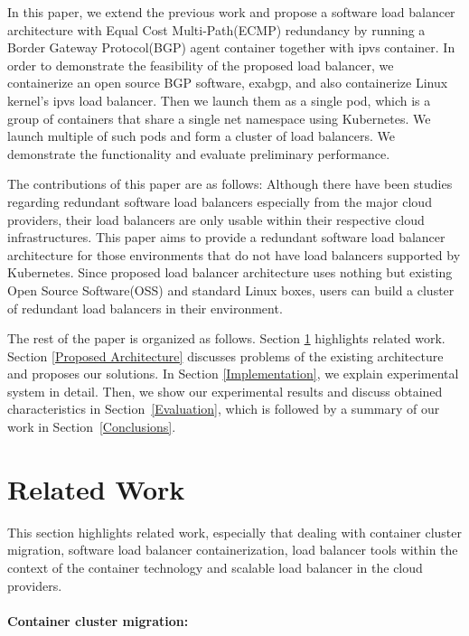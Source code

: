 In this paper, we extend the previous work and propose a software load balancer architecture with Equal Cost Multi-Path(ECMP)\cite{thaler2000multipath} redundancy by running a Border Gateway Protocol(BGP) agent container together with ipvs container.
In order to demonstrate the feasibility of the proposed load balancer, we containerize an open source BGP software, exabgp\cite{exa-networks_2018}, and also containerize Linux kernel's ipvs load balancer. Then we launch them as a single pod, which is a group of containers that share a single net namespace using Kubernetes. We launch multiple of such pods and form a cluster of load balancers.
We demonstrate the functionality and evaluate preliminary performance.

The contributions of this paper are as follows:
Although there have been studies regarding redundant software load balancers especially from the major cloud providers\cite{eisenbud2016maglev,patel2013ananta}, their load balancers are only usable within their respective cloud infrastructures.
This paper aims to provide a redundant software load balancer architecture for those environments that do not have load balancers supported by Kubernetes.
Since proposed load balancer architecture uses nothing but existing Open Source Software(OSS) and standard Linux boxes, users can build a cluster of redundant load balancers in their environment.

The rest of the paper is organized as follows.
Section \ref{Related Work} highlights related work.
Section \ref{Proposed Architecture} discusses problems of the existing architecture and proposes our solutions.
In Section \ref{Implementation}, we explain experimental system in detail.
Then, we show our experimental results and discuss obtained characteristics in Section~\ref{Evaluation}, which is followed by a summary of our work in Section~\ref{Conclusions}.

\section{Related Work}\label{Related Work}

This section highlights related work, especially that dealing with container cluster migration, 
software load balancer containerization, load balancer tools within the context of the container technology and scalable load balancer in the cloud providers.

\paragraph{\bf Container cluster migration:}

